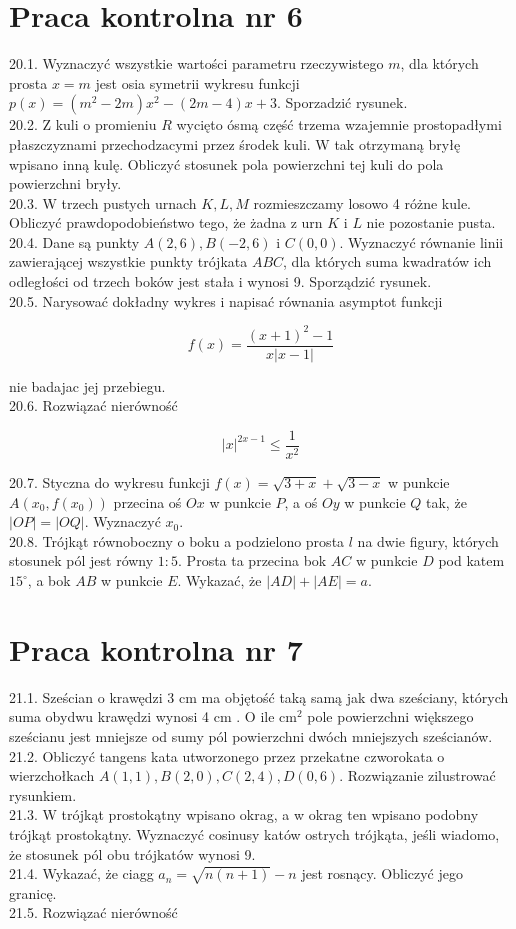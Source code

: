 \documentclass[10pt]{article}
\begin{document}
\section*{Praca kontrolna nr 6}
20.1. Wyznaczyć wszystkie wartości parametru rzeczywistego $m$, dla których prosta $x=m$ jest osia symetrii wykresu funkcji $p(x)=\left(m^{2}-2 m\right) x^{2}-(2 m-4) x+3$. Sporzadzić rysunek.\\
20.2. Z kuli o promieniu $R$ wycięto ósmą część trzema wzajemnie prostopadłymi płaszczyznami przechodzacymi przez środek kuli. W tak otrzymaną bryłę wpisano inną kulę. Obliczyć stosunek pola powierzchni tej kuli do pola powierzchni bryły.\\
20.3. W trzech pustych urnach $K, L, M$ rozmieszczamy losowo 4 różne kule. Obliczyć prawdopodobieństwo tego, że żadna z urn $K$ i $L$ nie pozostanie pusta.\\
20.4. Dane są punkty $A(2,6), B(-2,6)$ i $C(0,0)$. Wyznaczyć równanie linii zawierającej wszystkie punkty trójkata $A B C$, dla których suma kwadratów ich odległości od trzech boków jest stała i wynosi 9. Sporządzić rysunek.\\
20.5. Narysować dokładny wykres i napisać równania asymptot funkcji

$$
f(x)=\frac{(x+1)^{2}-1}{x|x-1|}
$$

nie badajac jej przebiegu.\\
20.6. Rozwiązać nierówność

$$
|x|^{2 x-1} \leq \frac{1}{x^{2}}
$$

20.7. Styczna do wykresu funkcji $f(x)=\sqrt{3+x}+\sqrt{3-x}$ w punkcie $A\left(x_{0}, f\left(x_{0}\right)\right)$ przecina oś $O x$ w punkcie $P$, a oś $O y$ w punkcie $Q$ tak, że $|O P|=|O Q|$. Wyznaczyć $x_{0}$.\\
20.8. Trójkąt równoboczny o boku a podzielono prosta $l$ na dwie figury, których stosunek pól jest równy $1: 5$. Prosta ta przecina bok $A C$ w punkcie $D$ pod katem $15^{\circ}$, a bok $A B$ w punkcie $E$. Wykazać, że $|A D|+|A E|=a$.

\section*{Praca kontrolna nr 7}
21.1. Sześcian o krawędzi 3 cm ma objętość taką samą jak dwa sześciany, których suma obydwu krawędzi wynosi 4 cm . O ile $\mathrm{cm}^{2}$ pole powierzchni większego sześcianu jest mniejsze od sumy pól powierzchni dwóch mniejszych sześcianów.\\
21.2. Obliczyć tangens kata utworzonego przez przekatne czworokata o wierzchołkach $A(1,1), B(2,0), C(2,4), D(0,6)$. Rozwiązanie zilustrować rysunkiem.\\
21.3. W trójkąt prostokątny wpisano okrag, a w okrag ten wpisano podobny trójkąt prostokątny. Wyznaczyć cosinusy katów ostrych trójkąta, jeśli wiadomo, że stosunek pól obu trójkatów wynosi 9.\\
21.4. Wykazać, że ciagg $a_{n}=\sqrt{n(n+1)}-n$ jest rosnący. Obliczyć jego granicę.\\
21.5. Rozwiązać nierówność
\end{document}
